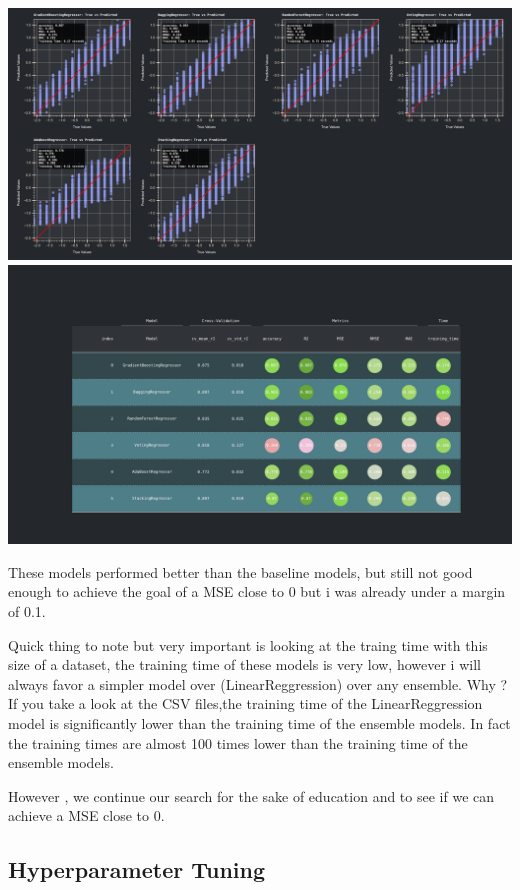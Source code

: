\documentclass{assignment}
\begin{document}
\begin{center}
    \includegraphics[width=6.5in]{../report/assets/ensemble_methods_results.pdf}    
    \includegraphics[width=6.5in]{../report/assets/ensemble_methods_results_table.pdf}    
\end{center}
These models performed better than the baseline models, but still not good enough to achieve the goal of a MSE close to 0 but i was already under a margin of 0.1.

Quick thing to note but very important is looking at the traing time with this size of a dataset, the training time of these models is very low, 
however i will always favor a simpler model over (LinearReggression) over any ensemble.
Why ? If you take a look at the CSV files,the training time of the LinearReggression model is significantly lower than the training time of the ensemble models.
In fact the training times are almost 100 times lower than the training time of the ensemble models.

However , we continue our search for the sake of education and to see if we can achieve a MSE close to 0.

\newpage
\subsection{Hyperparameter Tuning}
\end{document}

